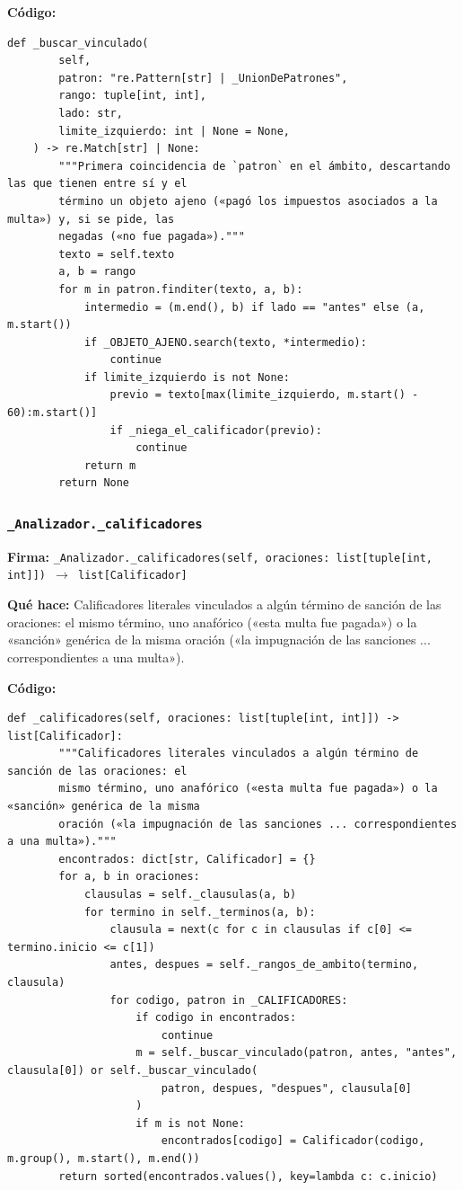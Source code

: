 \documentclass[11pt,a4paper]{article}
\begin{document}
\textbf{Código:}
\begin{lstlisting}
def _buscar_vinculado(
        self,
        patron: "re.Pattern[str] | _UnionDePatrones",
        rango: tuple[int, int],
        lado: str,
        limite_izquierdo: int | None = None,
    ) -> re.Match[str] | None:
        """Primera coincidencia de `patron` en el ámbito, descartando las que tienen entre sí y el
        término un objeto ajeno («pagó los impuestos asociados a la multa») y, si se pide, las
        negadas («no fue pagada»)."""
        texto = self.texto
        a, b = rango
        for m in patron.finditer(texto, a, b):
            intermedio = (m.end(), b) if lado == "antes" else (a, m.start())
            if _OBJETO_AJENO.search(texto, *intermedio):
                continue
            if limite_izquierdo is not None:
                previo = texto[max(limite_izquierdo, m.start() - 60):m.start()]
                if _niega_el_calificador(previo):
                    continue
            return m
        return None
\end{lstlisting}

\subsubsection*{\texttt{\_Analizador.\_calificadores}}
\textbf{Firma:} \texttt{\_Analizador.\_calificadores(self, oraciones: list[tuple[int, int]]) $\rightarrow$ list[Calificador]}

\textbf{Qué hace:} Calificadores literales vinculados a algún término de sanción de las oraciones: el
mismo término, uno anafórico («esta multa fue pagada») o la «sanción» genérica de la misma
oración («la impugnación de las sanciones ... correspondientes a una multa»).

\textbf{Código:}
\begin{lstlisting}
def _calificadores(self, oraciones: list[tuple[int, int]]) -> list[Calificador]:
        """Calificadores literales vinculados a algún término de sanción de las oraciones: el
        mismo término, uno anafórico («esta multa fue pagada») o la «sanción» genérica de la misma
        oración («la impugnación de las sanciones ... correspondientes a una multa»)."""
        encontrados: dict[str, Calificador] = {}
        for a, b in oraciones:
            clausulas = self._clausulas(a, b)
            for termino in self._terminos(a, b):
                clausula = next(c for c in clausulas if c[0] <= termino.inicio <= c[1])
                antes, despues = self._rangos_de_ambito(termino, clausula)
                for codigo, patron in _CALIFICADORES:
                    if codigo in encontrados:
                        continue
                    m = self._buscar_vinculado(patron, antes, "antes", clausula[0]) or self._buscar_vinculado(
                        patron, despues, "despues", clausula[0]
                    )
                    if m is not None:
                        encontrados[codigo] = Calificador(codigo, m.group(), m.start(), m.end())
        return sorted(encontrados.values(), key=lambda c: c.inicio)
\end{lstlisting}
\end{document}
